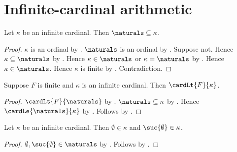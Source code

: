 \section{Infinite-cardinal arithmetic}







\begin{theorem}\label{naturals_subseteq_infinite_cardinal}
    Let $\kappa$ be an infinite cardinal.
    Then $\naturals\subseteq\kappa$.
\end{theorem}
\begin{proof}
    $\kappa$ is an ordinal by .
    $\naturals$ is an ordinal by .
    Suppose not.
    Hence $\kappa\subseteq\naturals$
        by .
    Hence $\kappa\in\naturals$ or $\kappa=\naturals$
        by .
    Hence $\kappa\in\naturals$.
    Hence $\kappa$ is finite by .
    Contradiction.
\end{proof}

\begin{proposition}\label{finite_below_infinite}
    Suppose $F$ is finite and $\kappa$ is an infinite cardinal.
    Then $\cardLt{F}{\kappa}$.
\end{proposition}
\begin{proof}
    $\cardLt{F}{\naturals}$ by
        .
    $\naturals\subseteq\kappa$ by
        .
    Hence $\cardLe{\naturals}{\kappa}$ by
        .
    Follows by .
\end{proof}

\begin{corollary}\label{zero_one_in_infinite_cardinal}
    Let $\kappa$ be an infinite cardinal.
    Then $\emptyset\in\kappa$ and $\suc{\emptyset}\in\kappa$.
\end{corollary}
\begin{proof}
    $\emptyset,\suc{\emptyset}\in\naturals$
        by .
    Follows by .
\end{proof}

